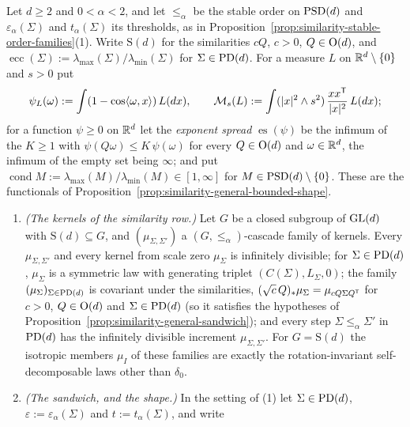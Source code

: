 \begin{proposition}\label{prop:similarity-stable-order-kernels}
Let $d \ge 2$ and $0 < \alpha < 2$, and let $\le_\alpha$ be the stable order on $\mathrm{PSD}(d)$ and
$\varepsilon_\alpha(\Sigma)$ and $t_\alpha(\Sigma)$ its thresholds, as in
Proposition~\ref{prop:similarity-stable-order-families}(1). Write $\mathrm S(d)$ for the similarities $cQ$, $c > 0$,
$Q \in \mathrm{O}(d)$, and $\operatorname{ecc}(\Sigma) := \lambda_{\max}(\Sigma)/\lambda_{\min}(\Sigma)$ for
$\Sigma \in \mathrm{PD}(d)$. For a measure $L$ on $\mathbb{R}^d \setminus \{0\}$ and $s > 0$ put
\[
  \psi_L(\omega) := \int(1 - \cos\langle\omega,x\rangle)\,L(dx) ,
  \qquad
  \mathcal M_s(L) := \int(|x|^2 \wedge s^2)\,\frac{xx^{\mathsf{T}}}{|x|^2}\,L(dx) ;
\]
for a function $\psi \ge 0$ on $\mathbb{R}^d$ let the \emph{exponent spread} $\operatorname{es}(\psi)$ be the
infimum of the $K \ge 1$ with $\psi(Q\omega) \le K\,\psi(\omega)$ for every $Q \in \mathrm{O}(d)$ and
$\omega \in \mathbb{R}^d$, the infimum of the empty set being $\infty$; and put
$\operatorname{cond}M := \lambda_{\max}(M)/\lambda_{\min}(M) \in [1,\infty]$ for
$M \in \mathrm{PSD}(d) \setminus \{0\}$. These are the functionals of
Proposition~\ref{prop:similarity-general-bounded-shape}.
\begin{enumerate}
\item \emph{(The kernels of the similarity row.)} Let $G$ be a closed subgroup of $\mathrm{GL}(d)$ with
$\mathrm S(d) \subseteq G$, and $(\mu_{\Sigma,\Sigma'})$ a $(G, \le_\alpha)$-cascade family of kernels.
Every $\mu_{\Sigma,\Sigma'}$ and every kernel from scale zero $\mu_\Sigma$ is infinitely divisible; for
$\Sigma \in \mathrm{PD}(d)$, $\mu_\Sigma$ is a symmetric law with generating triplet $(C(\Sigma), L_\Sigma, 0)$;
the family $(\mu_\Sigma)_{\Sigma \in \mathrm{PD}(d)}$ is covariant under the similarities,
$(\sqrt c\,Q)_*\mu_\Sigma = \mu_{cQ\Sigma Q^{\mathsf{T}}}$ for $c > 0$, $Q \in \mathrm{O}(d)$ and $\Sigma \in \mathrm{PD}(d)$
(so it satisfies the hypotheses of Proposition~\ref{prop:similarity-general-sandwich}); and every
step $\Sigma \le_\alpha \Sigma'$ in $\mathrm{PD}(d)$ has the infinitely divisible increment $\mu_{\Sigma,\Sigma'}$.
For $G = \mathrm S(d)$ the isotropic members $\mu_I$ of these families are exactly the rotation-invariant
self-decomposable laws other than $\delta_0$.
\item \emph{(The sandwich, and the shape.)} In the setting of (1) let $\Sigma \in \mathrm{PD}(d)$,
$\varepsilon := \varepsilon_\alpha(\Sigma)$ and $t := t_\alpha(\Sigma)$, and write

\end{enumerate}
\end{proposition}
